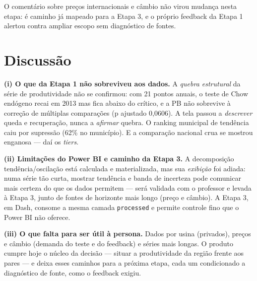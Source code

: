 \documentclass[11pt,a4paper]{article}
\begin{document}
O comentário sobre preços internacionais e câmbio não virou mudança nesta etapa: é caminho já
mapeado para a Etapa 3, e o próprio feedback da Etapa 1 alertou contra ampliar escopo sem
diagnóstico de fontes.

\section{Discussão}

\textbf{(i) O que da Etapa 1 não sobreviveu aos dados.} A \textit{quebra estrutural} da série de
produtividade não se confirmou: com 21 pontos anuais, o teste de Chow endógeno recai em 2013 mas
fica abaixo do crítico, e a PB não sobrevive à correção de múltiplas comparações (p ajustado
0,0606). A tela passou a \textit{descrever} queda e recuperação, nunca a \textit{afirmar} quebra.
O ranking municipal de tendência caiu por supressão (62\% no município). E a comparação nacional
crua se mostrou enganosa — daí os \textit{tiers}.

\textbf{(ii) Limitações do Power BI e caminho da Etapa 3.} A decomposição tendência/oscilação está
calculada e materializada, mas sua \textit{exibição} foi adiada: numa série tão curta, mostrar
tendência e banda de incerteza pode comunicar mais certeza do que os dados permitem — será
validada com o professor e levada à Etapa 3, junto de fontes de horizonte mais longo (preço e
câmbio). A Etapa 3, em Dash, consome a mesma camada \texttt{processed} e permite controle fino que
o Power BI não oferece.

\textbf{(iii) O que falta para ser útil à persona.} Dados por usina (privados), preços e câmbio
(demanda do teste e do feedback) e séries mais longas. O produto cumpre hoje o núcleo da decisão —
situar a produtividade da região frente aos pares — e deixa esses caminhos para a próxima etapa,
cada um condicionado a diagnóstico de fonte, como o feedback exigiu.
\end{document}
